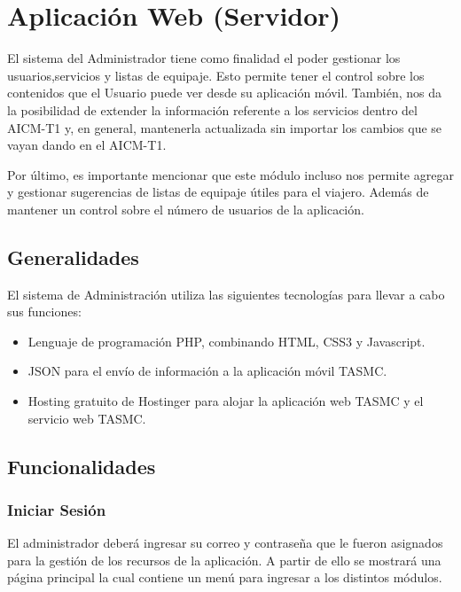 \section{Aplicación Web (Servidor)}

El sistema del Administrador tiene como finalidad el poder gestionar los usuarios,servicios y listas de equipaje.
Esto permite tener el control sobre los contenidos que el Usuario puede ver desde su aplicación móvil. También, nos da la posibilidad
de extender la información referente a los servicios dentro del AICM-T1 y, en general, mantenerla actualizada sin importar los cambios
que se vayan dando en el AICM-T1.

Por último, es importante mencionar que este módulo incluso nos permite agregar y gestionar sugerencias de listas de equipaje útiles 
para el viajero. Además de mantener un control sobre el número de usuarios de la aplicación.

\subsection{Generalidades}
El sistema de Administración utiliza las siguientes tecnologías para llevar a cabo sus funciones:
\begin{itemize}
 \item Lenguaje de programación PHP, combinando HTML, CSS3 y Javascript.
 \item JSON para el envío de información a la aplicación móvil TASMC.
 \item Hosting gratuito de Hostinger para alojar la aplicación web TASMC y el servicio web TASMC.
\end{itemize}

\subsection{Funcionalidades}

\subsubsection{Iniciar Sesión}
El administrador deberá ingresar su correo y contraseña que le fueron asignados para la gestión de los recursos de la aplicación. A partir 
de ello se mostrará una página principal la cual contiene un menú para ingresar a los distintos módulos.


